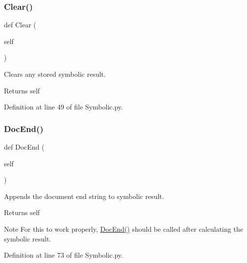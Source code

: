 \subsubsection{\texorpdfstring{Clear()}{Clear()}}
{\footnotesize\ttfamily def Clear (\begin{DoxyParamCaption}\item[{}]{self }\end{DoxyParamCaption})}



Clears any stored symbolic result. 

\begin{DoxyReturn}{Returns}
self 
\end{DoxyReturn}


Definition at line 49 of file Symbolic.\+py.

\mbox{\label{classSignalIntegrity_1_1SystemDescriptions_1_1Symbolic_1_1Symbolic_a91ac903754eabbc7f69d633a9304be70}} 
\subsubsection{\texorpdfstring{Doc\+End()}{DocEnd()}}
{\footnotesize\ttfamily def Doc\+End (\begin{DoxyParamCaption}\item[{}]{self }\end{DoxyParamCaption})}



Appends the document end string to symbolic result. 

\begin{DoxyReturn}{Returns}
self 
\end{DoxyReturn}
\begin{DoxyNote}{Note}
For this to work properly, \hyperlink{classSignalIntegrity_1_1SystemDescriptions_1_1Symbolic_1_1Symbolic_a91ac903754eabbc7f69d633a9304be70}{Doc\+End()} should be called after calculating the symbolic result. 
\end{DoxyNote}


Definition at line 73 of file Symbolic.\+py.

